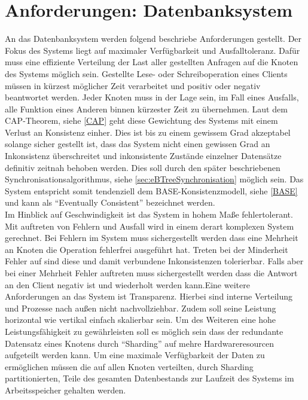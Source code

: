 \documentclass[a4paper,11pt,oneside,%
headsepline,												%
footsepline,												%
bibtotocnumbered									%
]{scrreprt}
\begin{document}
\section{Anforderungen: Datenbanksystem}
An das Datenbanksystem werden folgend beschriebe Anforderungen gestellt. Der Fokus des Systems liegt auf maximaler Verfügbarkeit und Ausfalltoleranz. Dafür muss eine effiziente Verteilung der Last aller gestellten Anfragen auf die Knoten des Systems möglich sein. Gestellte Lese- oder Schreiboperation eines Clients müssen in kürzest möglicher Zeit verarbeitet und positiv oder negativ beantwortet werden. Jeder Knoten muss in der Lage sein, im Fall eines Ausfalls, alle Funktion eines Anderen binnen kürzester Zeit zu übernehmen. Laut dem CAP-Theorem, siehe \autoref{CAP} geht diese Gewichtung des Systems mit einem Verlust an Konsistenz einher. Dies ist bis zu einem gewissem Grad akzeptabel solange sicher gestellt ist, dass das System nicht einen gewissen Grad an Inkonsistenz überschreitet und inkonsistente Zustände einzelner Datensätze definitiv zeitnah behoben werden. Dies soll durch den später beschriebenen Synchronisationsalgorithmus, siehe \autoref{sec:eBTreeSynchronisation} möglich sein. Das System entspricht somit tendenziell dem BASE-Konsistenzmodell, siehe \autoref{BASE} und kann als \enquote{Eventually Consistent} bezeichnet werden.\\ 

Im Hinblick auf Geschwindigkeit ist das System in hohem Maße fehlertolerant. Mit auftreten von Fehlern und Ausfall wird in einem derart komplexen System gerechnet. Bei Fehlern im System muss sichergestellt werden dass eine Mehrheit an Knoten die Operation fehlerfrei ausgeführt hat. Treten bei der Minderheit Fehler auf sind diese und damit verbundene Inkonsistenzen tolerierbar. Falls aber bei einer Mehrheit Fehler auftreten muss sichergestellt werden dass die Antwort an den Client negativ ist und  wiederholt werden kann.Eine weitere Anforderungen an das System ist Transparenz. Hierbei sind interne Verteilung und Prozesse nach außen nicht nachvollziehbar. Zudem soll seine Leistung horizontal wie vertikal einfach skalierbar sein. Um des Weiteren eine hohe Leistungsfähigkeit zu gewährleisten soll es möglich sein dass der redundante Datensatz eines Knotens durch \enquote{Sharding} auf mehre Hardwareresourcen aufgeteilt werden kann. Um eine maximale Verfügbarkeit der Daten zu ermöglichen müssen die auf allen Knoten verteilten, durch Sharding partitionierten, Teile des gesamten Datenbestands zur Laufzeit des Systems im Arbeitsspeicher gehalten werden.
\end{document}
